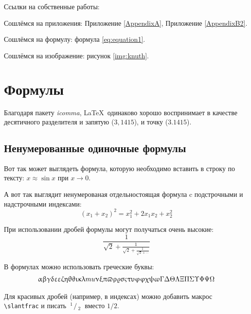 Ссылки на собственные работы:~\cite{vakbib1, confbib1}

Сошлёмся на приложения: Приложение \ref{AppendixA}, Приложение \ref{AppendixB2}.

Сошлёмся на формулу: формула \eqref{eq:equation1}.

Сошлёмся на изображение: рисунок \ref{img:knuth}.


\section{Формулы} \label{sect1_3}

Благодаря пакету \textit{icomma}, \LaTeX~одинаково хорошо воспринимает в качестве десятичного разделителя и запятую ($3,1415$), и точку ($3.1415$).

\subsection{Ненумерованные одиночные формулы} \label{subsect1_3_1}

Вот так может выглядеть формула, которую необходимо вставить в строку по тексту: $x \approx \sin x$ при $x \to 0$.

А вот так выглядит ненумерованая отдельностоящая формула c подстрочными и надстрочными индексами:
\[
(x_1+x_2)^2 = x_1^2 + 2 x_1 x_2 + x_2^2
\]

При использовании дробей формулы могут получаться очень высокие:
\[
  \frac{1}{\sqrt{2}+
  \displaystyle\frac{1}{\sqrt{2}+
  \displaystyle\frac{1}{\sqrt{2}+\cdots}}}
\]

В формулах можно использовать греческие буквы:
\[
\alpha\beta\gamma\delta\epsilon\varepsilon\zeta\eta\theta\vartheta\iota\kappa\lambda\\mu\nu\xi\pi\varpi\rho\varrho\sigma\varsigma\tau\upsilon\phi\varphi\chi\psi\omega\Gamma\Delta\Theta\Lambda\Xi\Pi\Sigma\Upsilon\Phi\Psi\Omega
\]

\def\slantfrac#1#2{ \hspace{3pt}\!^{#1}\!\!\hspace{1pt}/
  \hspace{2pt}\!\!_{#2}\!\hspace{3pt}
} %
Для красивых дробей (например, в индексах) можно добавить макрос
\verb+\slantfrac+ и писать $\slantfrac{1}{2}$ вместо $1/2$.


